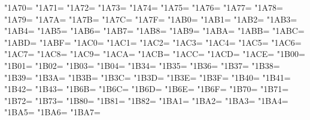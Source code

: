 \XeTeXcharclass"1A70=\KclassCM
\XeTeXcharclass"1A71=\KclassCM
\XeTeXcharclass"1A72=\KclassCM
\XeTeXcharclass"1A73=\KclassCM
\XeTeXcharclass"1A74=\KclassCM
\XeTeXcharclass"1A75=\KclassCM
\XeTeXcharclass"1A76=\KclassCM
\XeTeXcharclass"1A77=\KclassCM
\XeTeXcharclass"1A78=\KclassCM
\XeTeXcharclass"1A79=\KclassCM
\XeTeXcharclass"1A7A=\KclassCM
\XeTeXcharclass"1A7B=\KclassCM
\XeTeXcharclass"1A7C=\KclassCM
\XeTeXcharclass"1A7F=\KclassCM
\XeTeXcharclass"1AB0=\KclassCM
\XeTeXcharclass"1AB1=\KclassCM
\XeTeXcharclass"1AB2=\KclassCM
\XeTeXcharclass"1AB3=\KclassCM
\XeTeXcharclass"1AB4=\KclassCM
\XeTeXcharclass"1AB5=\KclassCM
\XeTeXcharclass"1AB6=\KclassCM
\XeTeXcharclass"1AB7=\KclassCM
\XeTeXcharclass"1AB8=\KclassCM
\XeTeXcharclass"1AB9=\KclassCM
\XeTeXcharclass"1ABA=\KclassCM
\XeTeXcharclass"1ABB=\KclassCM
\XeTeXcharclass"1ABC=\KclassCM
\XeTeXcharclass"1ABD=\KclassCM
\XeTeXcharclass"1ABF=\KclassCM
\XeTeXcharclass"1AC0=\KclassCM
\XeTeXcharclass"1AC1=\KclassCM
\XeTeXcharclass"1AC2=\KclassCM
\XeTeXcharclass"1AC3=\KclassCM
\XeTeXcharclass"1AC4=\KclassCM
\XeTeXcharclass"1AC5=\KclassCM
\XeTeXcharclass"1AC6=\KclassCM
\XeTeXcharclass"1AC7=\KclassCM
\XeTeXcharclass"1AC8=\KclassCM
\XeTeXcharclass"1AC9=\KclassCM
\XeTeXcharclass"1ACA=\KclassCM
\XeTeXcharclass"1ACB=\KclassCM
\XeTeXcharclass"1ACC=\KclassCM
\XeTeXcharclass"1ACD=\KclassCM
\XeTeXcharclass"1ACE=\KclassCM
\XeTeXcharclass"1B00=\KclassCM
\XeTeXcharclass"1B01=\KclassCM
\XeTeXcharclass"1B02=\KclassCM
\XeTeXcharclass"1B03=\KclassCM
\XeTeXcharclass"1B04=\KclassCM
\XeTeXcharclass"1B34=\KclassCM
\XeTeXcharclass"1B35=\KclassCM
\XeTeXcharclass"1B36=\KclassCM
\XeTeXcharclass"1B37=\KclassCM
\XeTeXcharclass"1B38=\KclassCM
\XeTeXcharclass"1B39=\KclassCM
\XeTeXcharclass"1B3A=\KclassCM
\XeTeXcharclass"1B3B=\KclassCM
\XeTeXcharclass"1B3C=\KclassCM
\XeTeXcharclass"1B3D=\KclassCM
\XeTeXcharclass"1B3E=\KclassCM
\XeTeXcharclass"1B3F=\KclassCM
\XeTeXcharclass"1B40=\KclassCM
\XeTeXcharclass"1B41=\KclassCM
\XeTeXcharclass"1B42=\KclassCM
\XeTeXcharclass"1B43=\KclassCM
\XeTeXcharclass"1B6B=\KclassCM
\XeTeXcharclass"1B6C=\KclassCM
\XeTeXcharclass"1B6D=\KclassCM
\XeTeXcharclass"1B6E=\KclassCM
\XeTeXcharclass"1B6F=\KclassCM
\XeTeXcharclass"1B70=\KclassCM
\XeTeXcharclass"1B71=\KclassCM
\XeTeXcharclass"1B72=\KclassCM
\XeTeXcharclass"1B73=\KclassCM
\XeTeXcharclass"1B80=\KclassCM
\XeTeXcharclass"1B81=\KclassCM
\XeTeXcharclass"1B82=\KclassCM
\XeTeXcharclass"1BA1=\KclassCM
\XeTeXcharclass"1BA2=\KclassCM
\XeTeXcharclass"1BA3=\KclassCM
\XeTeXcharclass"1BA4=\KclassCM
\XeTeXcharclass"1BA5=\KclassCM
\XeTeXcharclass"1BA6=\KclassCM
\XeTeXcharclass"1BA7=\KclassCM
